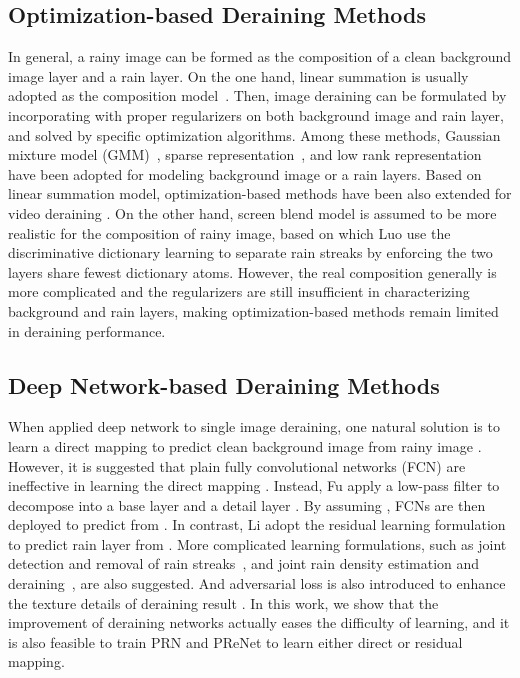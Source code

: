 \documentclass[10pt,twocolumn,letterpaper]{article}
\begin{document}
\subsection{Optimization-based Deraining Methods}
In general, a rainy image can be formed as the composition of a clean background image layer and a rain layer.
On the one hand, linear summation is usually adopted as the composition model~\cite{chen2013generalized,li2016rain,zhu2017joint}.
Then, image deraining can be formulated by incorporating with proper regularizers on both background image and rain layer, and solved by specific optimization algorithms.
Among these methods, Gaussian mixture model (GMM)~\cite{li2016rain}, sparse representation~\cite{zhu2017joint}, and low rank representation~\cite{chen2013generalized} have been adopted for modeling background image or a rain layers.
Based on linear summation model, optimization-based methods have been also extended for video deraining \cite{garg2004detection,jiang2017novel,jiang2018fastderain,kim2015video,li2018video}.
On the other hand, screen blend model \cite{luo2015removing,ren2018simultaneous} is assumed to be more realistic for the composition of rainy image, based on which Luo \etal \cite{luo2015removing} use
the discriminative dictionary learning to separate rain streaks by enforcing the two layers share fewest dictionary atoms.
However, the real composition generally is more complicated and the regularizers are still insufficient in characterizing background and rain layers, making optimization-based methods remain limited in deraining performance.





\subsection{Deep Network-based Deraining Methods}
When applied deep network to single image deraining, one natural solution is to learn a direct mapping to predict clean background image  from rainy image .
However, it is suggested that plain fully convolutional networks (FCN) are ineffective in learning the direct mapping \cite{fu2017clearing,fu2017removing}.
Instead, Fu \etal \cite{fu2017clearing,fu2017removing} apply a low-pass filter to decompose  into a base layer  and a detail layer .
By assuming , FCNs are then deployed to predict  from .
In contrast, Li \etal \cite{li2018recurrent} adopt the residual learning formulation to predict rain layer  from .
More complicated learning formulations, such as joint detection and removal of rain streaks~\cite{yang2017deep}, and joint rain density estimation and deraining~\cite{zhang2018density}, are also suggested.
And adversarial loss is also introduced to enhance the texture details of deraining result \cite{zhang2017image,qian2018attentive}.
In this work, we show that the improvement of deraining networks actually eases the difficulty of learning, and it is also feasible to train PRN and PReNet to learn either direct or residual mapping.
\end{document}
